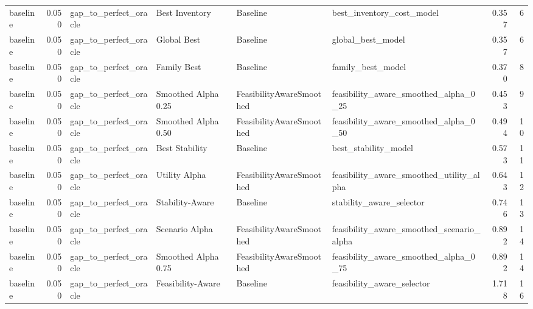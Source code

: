 \begin{table}
{\begin{tabular}{lrllllrr}
      baseline &             0.050 &       gap\_to\_perfect\_oracle &        Best Inventory &                  Baseline &                          best\_inventory\_cost\_model &         0.357 &               6 \\
      baseline &             0.050 &       gap\_to\_perfect\_oracle &           Global Best &                  Baseline &                                  global\_best\_model &         0.357 &               6 \\
      baseline &             0.050 &       gap\_to\_perfect\_oracle &           Family Best &                  Baseline &                                  family\_best\_model &         0.370 &               8 \\
      baseline &             0.050 &       gap\_to\_perfect\_oracle &   Smoothed Alpha 0.25 &  FeasibilityAwareSmoothed &              feasibility\_aware\_smoothed\_alpha\_0\_25 &         0.453 &               9 \\
      baseline &             0.050 &       gap\_to\_perfect\_oracle &   Smoothed Alpha 0.50 &  FeasibilityAwareSmoothed &              feasibility\_aware\_smoothed\_alpha\_0\_50 &         0.494 &              10 \\
      baseline &             0.050 &       gap\_to\_perfect\_oracle &        Best Stability &                  Baseline &                               best\_stability\_model &         0.573 &              11 \\
      baseline &             0.050 &       gap\_to\_perfect\_oracle &         Utility Alpha &  FeasibilityAwareSmoothed &           feasibility\_aware\_smoothed\_utility\_alpha &         0.643 &              12 \\
      baseline &             0.050 &       gap\_to\_perfect\_oracle &       Stability-Aware &                  Baseline &                           stability\_aware\_selector &         0.746 &              13 \\
      baseline &             0.050 &       gap\_to\_perfect\_oracle &        Scenario Alpha &  FeasibilityAwareSmoothed &          feasibility\_aware\_smoothed\_scenario\_alpha &         0.892 &              14 \\
      baseline &             0.050 &       gap\_to\_perfect\_oracle &   Smoothed Alpha 0.75 &  FeasibilityAwareSmoothed &              feasibility\_aware\_smoothed\_alpha\_0\_75 &         0.892 &              14 \\
      baseline &             0.050 &       gap\_to\_perfect\_oracle &     Feasibility-Aware &                  Baseline &                         feasibility\_aware\_selector &         1.718 &              16 \\

\end{tabular}}
\end{table}
